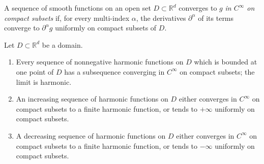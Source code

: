 A sequence of smooth functions on an open set $D\subset\mathbb R^d$ converges to $g$ \emph{in $C^\infty$ on compact subsets} if, for every multi-index $\alpha$, the derivatives $\partial^\alpha$ of its terms converge to $\partial^\alpha g$ uniformly on compact subsets of $D$.

\begin{corollary}\label{cor:harmonic-normal-limits}
Let $D\subset\mathbb R^d$ be a domain.
\begin{enumerate}
\item Every sequence of nonnegative harmonic functions on $D$ which is bounded at one point of $D$ has a subsequence converging in $C^\infty$ on compact subsets; the limit is harmonic.
\item An increasing sequence of harmonic functions on $D$ either converges in $C^\infty$ on compact subsets to a finite harmonic function, or tends to $+\infty$ uniformly on compact subsets.
\item A decreasing sequence of harmonic functions on $D$ either converges in $C^\infty$ on compact subsets to a finite harmonic function, or tends to $-\infty$ uniformly on compact subsets.
\end{enumerate}
\end{corollary}

